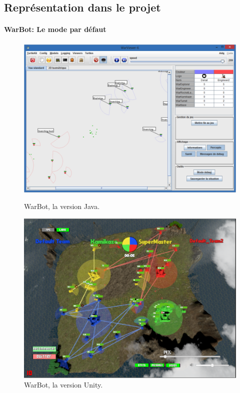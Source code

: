 \documentclass{report}
\begin{document}
\subsection{Représentation dans le projet}

\paragraph{WarBot: Le mode par défaut}
\paragraph{}
\begin{figure}[h]
    \begin{minipage}[c]{.46\linewidth}
        \centering
        \includegraphics[scale=0.45]{interface-warbot3}
        \caption{WarBot, la version Java.}
    \end{minipage}
    \hfill%
    \begin{minipage}[c]{.46\linewidth}
        \centering
        \includegraphics[scale=0.3]{WarbotUnity}
        \caption{WarBot, la version Unity.}
    \end{minipage}
\end{figure}
\end{document}
